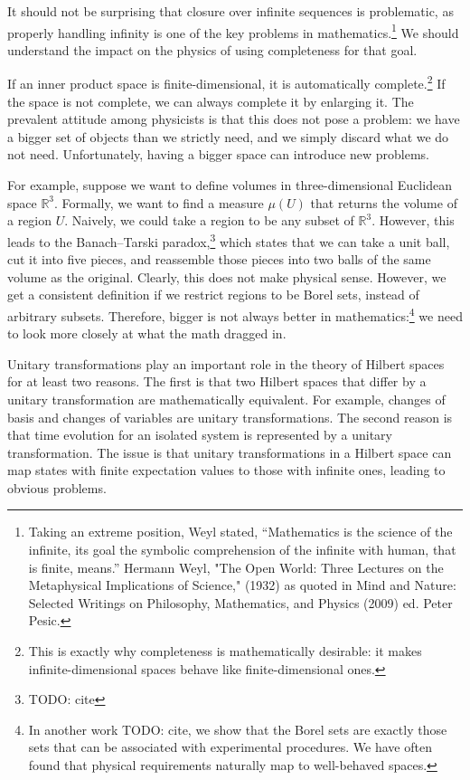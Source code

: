 \documentclass[10pt,twocolumn, nofootinbib]{revtex4-2}
\begin{document}
It should not be surprising that closure over infinite sequences is problematic, as properly handling infinity is one of the key problems in mathematics.\footnote{Taking an extreme position, Weyl stated, ``Mathematics is the science of the infinite, its goal the symbolic comprehension of the infinite with human, that is finite, means.'' Hermann Weyl, "The Open World: Three Lectures on the Metaphysical Implications of Science," (1932) as quoted in Mind and Nature: Selected Writings on Philosophy, Mathematics, and Physics (2009) ed. Peter Pesic.} We should understand the impact on the physics of using completeness for that goal. %

If an inner product space is finite-dimensional, it is automatically complete.\footnote{This is exactly why completeness is mathematically desirable: it makes infinite-dimensional spaces behave like finite-dimensional ones.} If the space is not complete, we can always complete it by enlarging it. The prevalent attitude among physicists is that this does not pose a problem: we have a bigger set of objects than we strictly need, and we simply discard what we do not need. Unfortunately, having a bigger space can introduce new problems.

For example, suppose we want to define volumes in three-dimensional Euclidean space $\mathbb{R}^3$. Formally, we want to find a measure $\mu(U)$ that returns the volume of a region $U$. Naively, we could take a region to be any subset of $\mathbb{R}^3$. However, this leads to the Banach–Tarski paradox,\footnote{TODO: cite} which states that we can take a unit ball, cut it into five pieces, and reassemble those pieces into two balls of the same volume as the original. Clearly, this does not make physical sense. However, we get a consistent definition if we restrict regions to be Borel sets, instead of arbitrary subsets. Therefore, bigger is not always better in mathematics:\footnote{In another work TODO: cite, we show that the Borel sets are exactly those sets that can be associated with experimental procedures. We have often found that physical requirements naturally map to well-behaved spaces.%
} we need to look more closely at what the math dragged in.

Unitary transformations play an important role in the theory of Hilbert spaces for at least two reasons. The first is that two Hilbert spaces that differ by a unitary transformation are mathematically equivalent. For example, changes of basis and changes of variables are unitary transformations. The second reason is that time evolution for an isolated system is represented by a unitary transformation. The issue is that unitary transformations in a Hilbert space can map states with finite expectation values to those with infinite ones, leading to obvious problems.
\end{document}
